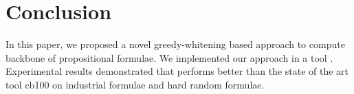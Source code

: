 \section{Conclusion}\label{sec:conc}
In this paper, we proposed a novel greedy-whitening based approach \tool to compute backbone of propositional formulae.
We implemented our approach in a tool \tool. Experimental results demonstrated that
\tool performs better than the state of the art tool cb100 on industrial formulae and hard random formulae.
